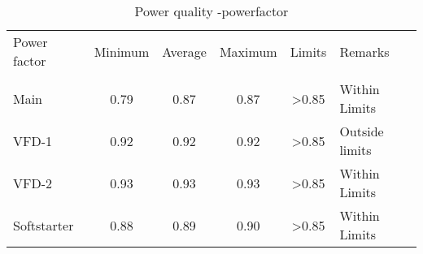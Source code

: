 \begin{table}[!htb]
	\caption{Power quality -powerfactor}
	\label{tbl_ch04_elecaudit_powerquality_powerfactor}
	{\scriptsize
	\begin{tabular}{l|l|l|l|l|l}
\hline
Power factor & \multicolumn{1}{c|}{Minimum} & \multicolumn{1}{c|}{Average} & \multicolumn{1}{c|}{Maximum} & \multicolumn{1}{c|}{Limits} & Remarks \\ 
& \multicolumn{1}{c|}{} & \multicolumn{1}{c|}{} & \multicolumn{1}{c|}{} & \multicolumn{1}{c|}{} &  \\ 
\hline
Main  & \multicolumn{1}{c|}{0.79} & \multicolumn{1}{c|}{0.87} & \multicolumn{1}{c|}{0.87} & \multicolumn{1}{c|}{>0.85} & Within  Limits \\ 
VFD-1 & \multicolumn{1}{c|}{0.92} & \multicolumn{1}{c|}{0.92} & \multicolumn{1}{c|}{0.92} & \multicolumn{1}{c|}{>0.85} & Outside limits \\ 
VFD-2 & \multicolumn{1}{c|}{0.93} & \multicolumn{1}{c|}{0.93} & \multicolumn{1}{c|}{0.93} & \multicolumn{1}{c|}{>0.85} &  Within  Limits\\ 
Softstarter & \multicolumn{1}{c|}{0.88} & \multicolumn{1}{c|}{0.89} & \multicolumn{1}{c|}{0.90} & \multicolumn{1}{c|}{>0.85} & Within  Limits \\ 
\hline
	\end{tabular}	
	
	}%
\end{table}
